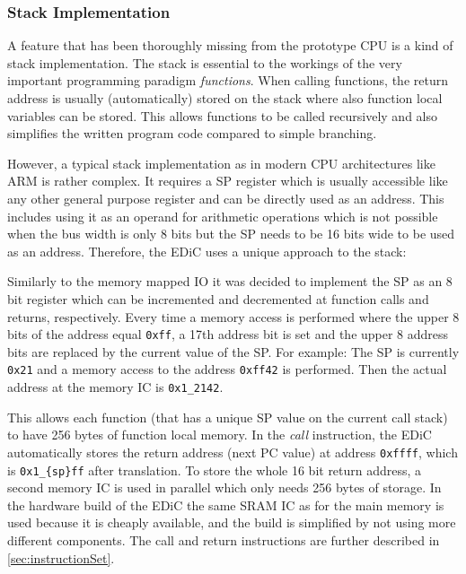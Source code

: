 \subsubsection{Stack Implementation}\label{sec:stack}
A feature that has been thoroughly missing from the prototype \gls{CPU} is a kind of stack implementation.
The stack is essential to the workings of the very important programming paradigm \emph{functions}.
When calling functions, the return address is usually (automatically) stored on the stack where also function local variables can be stored.
This allows functions to be called recursively and also simplifies the written program code compared to simple branching.

However, a typical stack implementation as in modern \gls{CPU} architectures like ARM is rather complex.
It requires a \gls{SP} register which is usually accessible like any other general purpose register and can be directly used as an address.
This includes using it as an operand for arithmetic operations which is not possible when the bus width is only 8 bits but the \gls{SP} needs to be 16 bits wide to be used as an address.
Therefore, the \gls{EDiC} uses a unique approach to the stack:

Similarly to the memory mapped \gls{IO} it was decided to implement the \gls{SP} as an 8 bit register which can be incremented and decremented at function calls and returns, respectively.
Every time a memory access is performed where the upper 8 bits of the address equal \texttt{0xff}, a 17th address bit is set and the upper 8 address bits are replaced by the current value of the \gls{SP}.
For example: The \gls{SP}  is currently \texttt{0x21} and a memory access to the address \texttt{0xff42} is performed.
Then the actual address at the memory \gls{IC} is \texttt{0x1\_2142}.

This allows each function (that has a unique \gls{SP} value on the current call stack) to have 256 bytes of function local memory.
In the \emph{call} instruction, the \gls{EDiC} automatically stores the return address (next \gls{PC} value) at address \texttt{0xffff}, which is \texttt{0x1\_\{sp\}ff} after translation.
To store the whole 16 bit return address, a second memory \gls{IC} is used in parallel which only needs 256 bytes of storage.
In the hardware build of the \gls{EDiC} the same \gls{SRAM} \gls{IC} as for the main memory is used because it is cheaply available, and the build is simplified by not using more different components.
The call and return instructions are further described in \cref{sec:instructionSet}.

